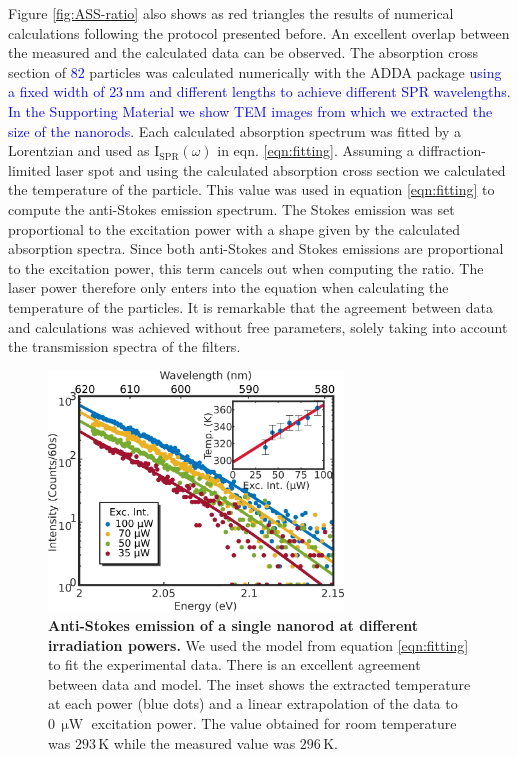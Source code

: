 \documentclass[journal=nalefd,manuscript=letter]{achemso}
\newcommand{\HI}[1]{\textcolor{blue}{#1}} %
\newcommand{\K}{\ensuremath{\,\textrm{K}}}
\newcommand{\nm}{\ensuremath{\,\textrm{nm}}}
\newcommand{\uW}{\ensuremath{\,\upmu\textrm{W}}}
\begin{document}
Figure \ref{fig:ASS-ratio} also shows as red triangles the results of numerical calculations following
the protocol presented before. 
An excellent overlap between the measured and the calculated data can
be observed. The absorption cross section of \HI{$82$} particles was calculated numerically
with the ADDA package\cite{Yurkin2011} \HI{using a fixed width of $23\nm$ and different 
lengths to achieve different SPR wavelengths. In the Supporting Material we 
show TEM images from which we extracted the size of the nanorods.}
Each calculated absorption spectrum was 
fitted by a Lorentzian and used as $\textrm{I}_{\textrm{SPR}}(\omega)$ in eqn.
\ref{eqn:fitting}. Assuming a diffraction-limited laser spot and using the
calculated absorption cross section we calculated the temperature of
the particle. This value was used in equation \ref{eqn:fitting} to compute the
anti-Stokes emission spectrum. The Stokes emission was set proportional to the
excitation power  with a shape given by the calculated absorption spectra. Since both
anti-Stokes and Stokes emissions are proportional to the excitation power, this
term cancels out when computing the ratio. The laser power therefore only enters
into the equation when calculating the temperature of the particles. It is
remarkable that the agreement between data and calculations was achieved
without free parameters, solely taking into account the transmission spectra of
the filters.

\begin{figure}[tp] \centering
\includegraphics[width=78.4mm]{Figures/03_Fit_Of_AS/03_Log_Fit_AS.png}
\caption{\textbf{Anti-Stokes emission of a single nanorod at different irradiation powers.} We used 
the model from equation \ref{eqn:fitting} to fit the experimental data. 
There is an excellent agreement between data and model. The inset shows the extracted
temperature at each power (blue dots) and a linear 
extrapolation of the data to $0\uW$ excitation power.
The value obtained for room temperature was $293\K$ while the measured value was
$296\K$.}
	\label{fig:AS_in_Log}
\end{figure}
\end{document}
